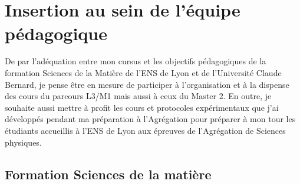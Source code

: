\documentclass[11pt,onecolumn]{article}
\begin{document}
\noindent {}    \\
    \\
    \\
    \\ 
    \\ 
    \\ 
   \\ 

\normalsize 

\section{Insertion au sein de l’équipe pédagogique}

De par l’adéquation entre mon cursus et les objectifs pédagogiques de la formation Sciences de la Matière de l’ENS de Lyon et de l’Université Claude Bernard, je pense être en mesure de participer à l’organisation et à la dispense des cours du parcours L3/M1 mais aussi à ceux du Master 2. En outre, je souhaite aussi mettre à profit les cours et protocoles expérimentaux que j’ai développés pendant ma préparation à l’Agrégation pour préparer à mon tour les étudiants accueillis à l’ENS de Lyon aux épreuves de l’Agrégation de Sciences physiques.

\subsection{Formation Sciences de la matière}
\end{document}
